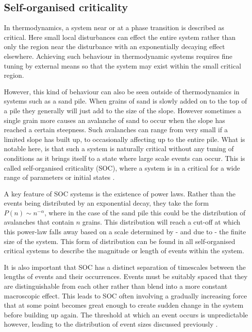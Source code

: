 \documentclass{article}
\numberwithin{equation}{section}
\begin{document}
\subsection{Self-organised criticality}
In thermodynamics, a system near or at a phase transition is described as critical. Here small local disturbances can effect the entire system rather than only the region near the disturbance with an exponentially decaying effect elsewhere. Achieving such behaviour in thermodynamic systems requires fine tuning by external means so that the system may exist within the small critical region.

However, this kind of behaviour can also be seen outside of thermodynamics in systems such as a sand pile. When grains of sand is slowly added on to the top of a pile they generally will just add to the size of the slope. However sometimes a single grain more causes an avalanche of sand to occur when the slope has reached a certain steepness. Such avalanches can range from very small if a limited slope has built up, to occasionally affecting up to the entire pile. What is notable here, is that such a system is naturally critical without any tuning of conditions as it brings itself to a state where large scale events can occur. This is called self-organised criticality (SOC), where a system is in a critical for a wide range of parameters or initial states \cite{Tang1993SOCState, Jensen1998Self-organizedSystems}.

A key feature of SOC systems is the existence of power laws. Rather than the events being distributed by an exponential decay, they take the form $P(n)\sim n^{-\alpha}$, where in the case of the sand pile this could be the distribution of avalanches that contain $n$ grains. This distribution will reach a cut-off at which this power-law falls away based on a scale determined by - and due to - the finite size of the system. This form of distribution can be found in all self-organised critical systems to describe the magnitude or length of events within the system.

It is also important that SOC has a distinct separation of timescales between the lengths of events and their occurrences. Events must be suitably spaced that they are distinguishable from each other rather than blend into a more constant macroscopic effect. This leads to SOC often involving a gradually increasing force that at some point becomes great enough to create sudden change in the system before building up again. The threshold at which an event occurs is unpredictable however, leading to the distribution of event sizes discussed previously \cite{Jensen1998Self-organizedSystems}.
\end{document}
